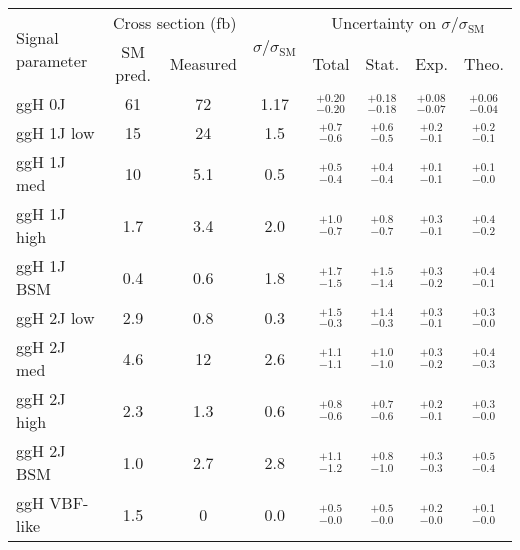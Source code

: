 \begin{tabular}{ l | c | c | c | c | c | c | c }
\multirow{2}{*}{Signal parameter} & \multicolumn{2}{c}{Cross section (fb)}  & \multirow{2}{*}{$\sigma/\sigma_{\text{SM}}$}    & \multicolumn{4}{c}{Uncertainty on $\sigma/\sigma_{\text{SM}}$} \\
             & \multicolumn{1}{c}{SM pred.}  & \multicolumn{1}{c}{Measured} &       & Total              & Stat.              & Exp.               & Theo.               \\
\hline
ggH 0J       & 61                            & 72                           & 1.17  & $_{-0.20}^{+0.20}$ & $_{-0.18}^{+0.18}$ & $_{-0.07}^{+0.08}$ & $_{-0.04}^{+0.06}$  \\[3pt]
ggH 1J low   & 15                            & 24                           & 1.5   & $_{-0.6}^{+0.7}$   & $_{-0.5}^{+0.6}$   & $_{-0.1}^{+0.2}$   & $_{-0.1}^{+0.2}$    \\[3pt]
ggH 1J med   & 10                            & 5.1                          & 0.5   & $_{-0.4}^{+0.5}$   & $_{-0.4}^{+0.4}$   & $_{-0.1}^{+0.1}$   & $_{-0.0}^{+0.1}$    \\[3pt]
ggH 1J high  & 1.7                           & 3.4                          & 2.0   & $_{-0.7}^{+1.0}$   & $_{-0.7}^{+0.8}$   & $_{-0.1}^{+0.3}$   & $_{-0.2}^{+0.4}$    \\[3pt]
ggH 1J BSM   & 0.4                           & 0.6                          & 1.8   & $_{-1.5}^{+1.7}$   & $_{-1.4}^{+1.5}$   & $_{-0.2}^{+0.3}$   & $_{-0.1}^{+0.4}$    \\[3pt]
ggH 2J low   & 2.9                           & 0.8                          & 0.3   & $_{-0.3}^{+1.5}$   & $_{-0.3}^{+1.4}$   & $_{-0.1}^{+0.3}$   & $_{-0.0}^{+0.3}$    \\[3pt]
ggH 2J med   & 4.6                           & 12                           & 2.6   & $_{-1.1}^{+1.1}$   & $_{-1.0}^{+1.0}$   & $_{-0.2}^{+0.3}$   & $_{-0.3}^{+0.4}$    \\[3pt]
ggH 2J high  & 2.3                           & 1.3                          & 0.6   & $_{-0.6}^{+0.8}$   & $_{-0.6}^{+0.7}$   & $_{-0.1}^{+0.2}$   & $_{-0.0}^{+0.3}$    \\[3pt]
ggH 2J BSM   & 1.0                           & 2.7                          & 2.8   & $_{-1.2}^{+1.1}$   & $_{-1.0}^{+0.8}$   & $_{-0.3}^{+0.3}$   & $_{-0.4}^{+0.5}$    \\[3pt]
ggH VBF-like & 1.5                           & 0                            & 0.0   & $_{-0.0}^{+0.5}$   & $_{-0.0}^{+0.5}$   & $_{-0.0}^{+0.2}$   & $_{-0.0}^{+0.1}$    \\[3pt]

\end{tabular}
